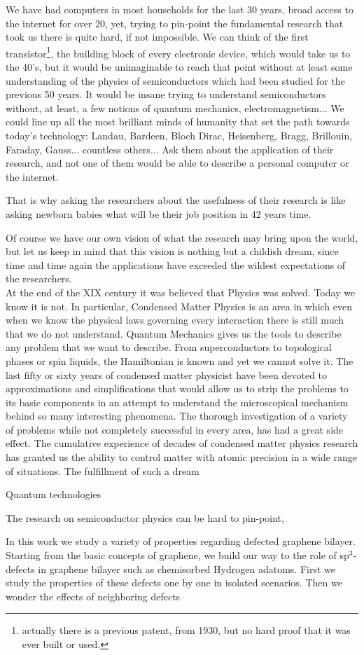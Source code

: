 We have had computers in most households for the last 30 years, broad access to the internet for over 20, yet, trying to pin-point the fundamental research that took us there is quite hard, if not impossible.
We can think of the first transistor\footnote{actually there is a previous patent, from 1930,\cite{diode} but no hard proof that it was ever built or used.},
the building block of every electronic device, which would take us to the 40's\cite{Ross}, but it would be unimaginable to reach that point without at least some understanding of the physics of semiconductors which had been studied for the previous 50 years. It would be insane trying to understand semiconductors without, at least, a few notions of quantum mechanics, electromagnetism...
We could line up all the most brilliant minds of humanity that set the path towards today's technology: Landau, Bardeen, Bloch Dirac, Heisenberg, Bragg, Brillouin, Faraday, Gauss... countless others... Ask them about the application of their research, and not one of them would be able to describe a personal computer or the internet.

That is why asking the researchers about the usefulness of their research is like asking newborn babies what will be their job position in 42 years time.

Of course we have our own vision of what the research may bring upon the world, but let us keep in mind that this vision is nothing but a childish dream, since time and time again the applications have exceeded the wildest expectations of the researchers.\\


At the end of the XIX century it was believed that Physics was solved. Today we know it is not. In particular, Condensed Matter Physics is an area in which even when we know the physical laws governing every interaction there is still much that we do not understand. Quantum Mechanics gives us the tools to describe any problem that we want to describe. From superconductors to topological phases or spin liquids, the Hamiltonian is known and yet we cannot solve it. The last fifty or sixty years of condensed matter physicist have been devoted to approximations and simplifications that would allow us to strip the problems to its basic components in an attempt to understand the microscopical mechanism behind so many interesting phenomena.
The thorough investigation of a variety of problems while not completely successful in every area, has had a great side effect. The cumulative experience of decades of condensed matter physics research has granted us the ability to control matter with atomic precision in a wide range of situations. The fulfillment of such a dream\cite{Feynman1982}

Quantum technologies\cite{QTF}

The research on semiconductor physics can be hard to pin-point, 


In this work we study a variety of properties regarding defected graphene bilayer. Starting from the basic concepts of graphene, we build our way to the role of sp$^3$-defects in graphene bilayer such as chemisorbed Hydrogen adatoms.
First we study the properties of these defects one by one in isolated scenarios. Then we wonder the effects of neighboring defects
